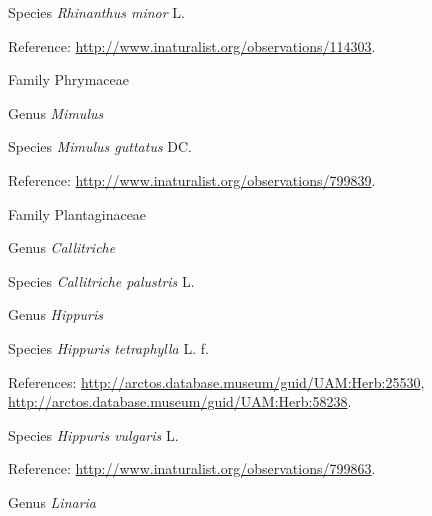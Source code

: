 \documentclass[9pt, article]{memoir}
\begin{document}
\begin{multicols}{2}
\vspace{6pt}\noindent\hspace{36pt}Species \textit{Rhinanthus minor} L.


\vspace{6pt}Reference: 
\url{http://www.inaturalist.org/observations/114303}.

\vspace{6pt}\noindent\hspace{24pt}Family Phrymaceae


\vspace{6pt}\noindent\hspace{30pt}Genus \textit{Mimulus}


\vspace{6pt}\noindent\hspace{36pt}Species \textit{Mimulus guttatus} DC.


\vspace{6pt}Reference: 
\url{http://www.inaturalist.org/observations/799839}.

\vspace{6pt}\noindent\hspace{24pt}Family Plantaginaceae


\vspace{6pt}\noindent\hspace{30pt}Genus \textit{Callitriche}


\vspace{6pt}\noindent\hspace{36pt}Species \textit{Callitriche palustris} L.


\vspace{6pt}\noindent\hspace{30pt}Genus \textit{Hippuris}


\vspace{6pt}\noindent\hspace{36pt}Species \textit{Hippuris tetraphylla} L. f.


\vspace{6pt}References: 
\url{http://arctos.database.museum/guid/UAM:Herb:25530}, 
\url{http://arctos.database.museum/guid/UAM:Herb:58238}.

\vspace{6pt}\noindent\hspace{36pt}Species \textit{Hippuris vulgaris} L.


\vspace{6pt}Reference: 
\url{http://www.inaturalist.org/observations/799863}.

\vspace{6pt}\noindent\hspace{30pt}Genus \textit{Linaria}



\end{multicols}
\end{document}
